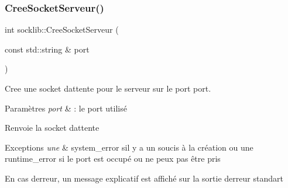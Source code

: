 \subsubsection{\texorpdfstring{Cree\+Socket\+Serveur()}{CreeSocketServeur()}}
{\footnotesize\ttfamily int socklib\+::\+Cree\+Socket\+Serveur (\begin{DoxyParamCaption}\item[{const std\+::string \&}]{port }\end{DoxyParamCaption})}



Cree une socket d\textquotesingle{}attente pour le serveur sur le port \textquotesingle{}\textquotesingle{}port\textquotesingle{}\textquotesingle{}. 


\begin{DoxyParams}{Paramètres}
{\em port} & \+: le port utilisé \\
\hline
\end{DoxyParams}
\begin{DoxyReturn}{Renvoie}
la socket d\textquotesingle{}attente 
\end{DoxyReturn}

\begin{DoxyExceptions}{Exceptions}
{\em une} & system\+\_\+error s\textquotesingle{}il y a un soucis à la création ou une runtime\+\_\+error si le port est occupé ou ne peux pas être pris\\
\hline
\end{DoxyExceptions}
En cas d\textquotesingle{}erreur, un message explicatif est affiché sur la sortie d\textquotesingle{}erreur standart 